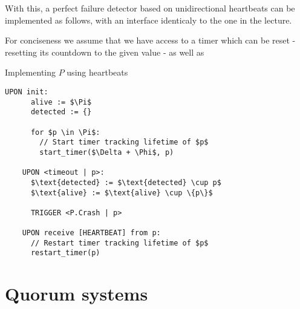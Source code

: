 \documentclass[a4paper]{scrreprt}
\begin{document}
With this, a perfect failure detector based on unidirectional heartbeats can be
implemented as follows, with an interface identicaly to the one in the lecture.

For conciseness we assume that we have access to a timer which can be reset - resetting its countdown to the given value - as well as

\begin{library}{Implementing $P$ using heartbeats}
  \begin{lstlisting}[mathescape=true,autogobble=true,breaklines=true]
    UPON init:
      alive := $\Pi$
      detected := {}

      for $p \in \Pi$:
        // Start timer tracking lifetime of $p$
        start_timer($\Delta + \Phi$, p)

    UPON <timeout | p>:
      $\text{detected} := $\text{detected} \cup p$
      $\text{alive} := $\text{alive} \cup \{p\}$

      TRIGGER <P.Crash | p>

    UPON receive [HEARTBEAT] from p:
      // Restart timer tracking lifetime of $p$
      restart_timer(p)
  \end{lstlisting}
\end{library}

\section{Quorum systems}
\end{document}
